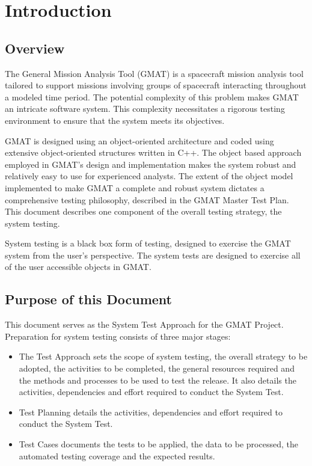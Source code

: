 \chapter{Introduction}


\section{Overview}

The General Mission Analysis Tool (GMAT) is a spacecraft mission analysis tool tailored to support
missions involving groups of spacecraft interacting throughout a modeled time period.  The potential
complexity of this problem makes GMAT an intricate software system.  This complexity necessitates a
rigorous testing environment to ensure that the system meets its objectives.

GMAT is designed using an object-oriented architecture\cite{GDT} and coded using extensive
object-oriented structures written in C++.  The object based approach employed in GMAT's design and
implementation makes the system robust and relatively easy to use for experienced analysts.  The
extent of the object model implemented to make GMAT a complete and robust system dictates a
comprehensive testing philosophy, described in the GMAT Master Test Plan\cite{MTP}.  This document
describes one component of the overall testing strategy, the system testing.

System testing is a black box form of testing, designed to exercise the GMAT system from the user's
perspective.  The system tests are designed to exercise all of the user accessible objects in GMAT.

\section{Purpose of this Document}

This document serves as the System Test Approach for the GMAT Project.  Preparation for system
testing consists of three major stages:

\begin{itemize}
\item The Test Approach sets the scope of system testing, the overall strategy to be adopted, the
activities to be completed, the general resources required and the methods and processes to be used
to test the release. It also details the activities, dependencies and effort required to conduct the
System Test.
\item Test Planning details the activities, dependencies and effort required to conduct the System
Test.
\item Test Cases documents the tests to be applied, the data to be processed, the automated testing
coverage and the expected results.
\end{itemize}

